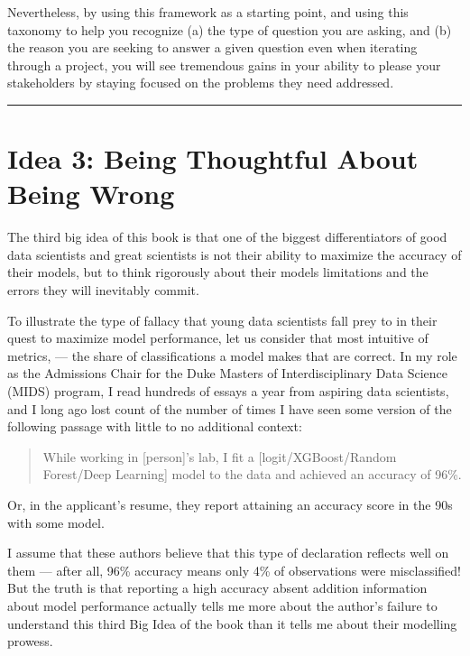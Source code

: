 \documentclass[letterpaper,10pt,english]{jupyterBook}
\begin{document}
\sphinxAtStartPar
Nevertheless, by using this framework as a starting point, and using this taxonomy to help you recognize (a) the type of question you are asking, and (b) the reason you are seeking to answer a given question even when iterating through a project, you will see tremendous gains in your ability to please your stakeholders by staying focused on the problems they need addressed.


\bigskip\hrule\bigskip


\sphinxstepscope


\section{Idea 3: Being Thoughtful About Being Wrong}
\label{\detokenize{10_introduction/23_mistakes:idea-3-being-thoughtful-about-being-wrong}}\label{\detokenize{10_introduction/23_mistakes::doc}}
\sphinxAtStartPar
The third big idea of this book is that one of the biggest differentiators of good data scientists and great scientists is not their ability to maximize the accuracy of their models, but to think rigorously about their models limitations and the errors they will inevitably commit.

\sphinxAtStartPar
To illustrate the type of fallacy that young data scientists fall prey to in their quest to maximize model performance, let us consider that most intuitive of metrics,  — the share of classifications a model makes that are correct. In my role as the Admissions Chair for the Duke Masters of Interdisciplinary Data Science (MIDS) program, I read hundreds of essays a year from aspiring data scientists, and I long ago lost count of the number of times I have seen some version of the following passage with little to no additional context:
\begin{quote}

\sphinxAtStartPar
While working in {[}person{]}’s lab, I fit a {[}logit/XGBoost/Random Forest/Deep Learning{]} model to the data and achieved an accuracy of 96\%.
\end{quote}

\sphinxAtStartPar
Or, in the applicant’s resume, they report attaining an accuracy score in the 90s with some model.

\sphinxAtStartPar
I assume that these authors believe that this type of declaration reflects well on them — after all, 96\% accuracy means only 4\% of observations were mis\sphinxhyphen{}classified! But the truth is that reporting a high accuracy absent addition information about model performance actually tells me more about the author’s failure to understand this third Big Idea of the book than it tells me about their modelling prowess.
\end{document}
